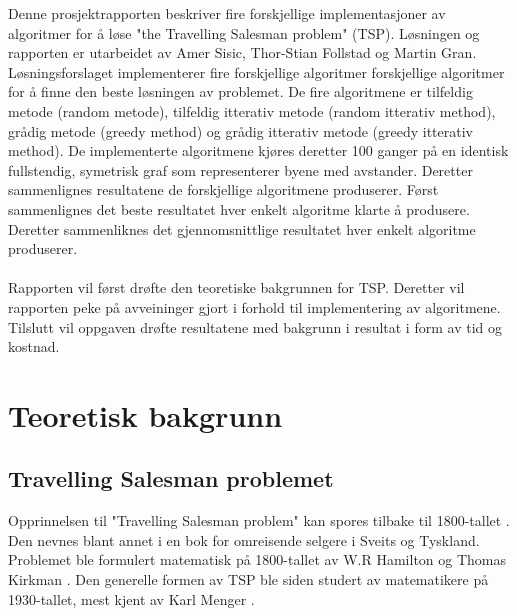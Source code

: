 \documentclass[12pt]{article}
\begin{document}
\indent
				Denne prosjektrapporten beskriver fire forskjellige implementasjoner av algoritmer for {\aa} l{\o}se "the Travelling Salesman problem" (TSP).
				L{\o}sningen og rapporten er utarbeidet av Amer Sisic, Thor-Stian Follstad og Martin Gran. L{\o}sningsforslaget implementerer fire forskjellige algoritmer
				forskjellige algoritmer for {\aa} finne den beste l{\o}sningen av problemet. De fire algoritmene er tilfeldig metode (random metode), tilfeldig itterativ metode (random itterativ method), gr{\aa}dig 
				metode (greedy method) og gr{\aa}dig itterativ metode (greedy itterativ method). De implementerte algoritmene kj{\o}res deretter 100 ganger p{\aa} en identisk
				fullstendig, symetrisk graf som representerer byene med avstander. Deretter sammenlignes resultatene de forskjellige algoritmene produserer. F{\o}rst sammenlignes
				det beste resultatet hver enkelt algoritme klarte {\aa} produsere. Deretter sammenliknes det gjennomsnittlige resultatet hver enkelt algoritme produserer. \\\\
				Rapporten vil f{\o}rst dr{\o}fte den teoretiske bakgrunnen for TSP. Deretter vil rapporten peke p{\aa} avveininger gjort i forhold til implementering av algoritmene.
				Tilslutt vil oppgaven dr{\o}fte resultatene med bakgrunn i resultat i form av tid og kostnad. \cite{a}


\section{Teoretisk bakgrunn}
\subsection{Travelling Salesman problemet}
				Opprinnelsen til "Travelling Salesman problem" kan spores tilbake til 1800-tallet \cite{b}. 
				Den nevnes blant annet i en bok for omreisende selgere i Sveits og Tyskland. Problemet ble formulert matematisk på 1800-tallet av W.R Hamilton og Thomas Kirkman \cite{c}. 
				Den generelle formen av TSP ble siden studert av matematikere på 1930-tallet, mest kjent av Karl Menger \cite{einstein}. 

\newpage



\end{document}
